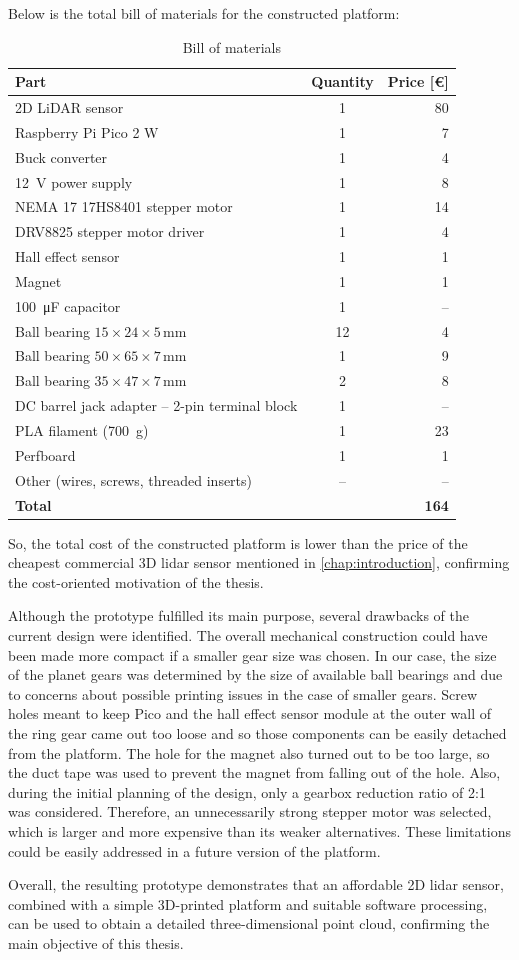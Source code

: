 Below is the total bill of materials for the constructed platform:
\begin{table}[H]
    \centering
    \caption{Bill of materials}
    \begin{tabular}{lcr}
        \toprule
        Part & Quantity & Price [\euro] \\
        \midrule
        2D LiDAR sensor & 1 & 80 \\
        Raspberry Pi Pico 2 W & 1 & 7 \\
        Buck converter & 1 & 4 \\
        \SI{12}{V} power supply & 1 & 8 \\
        NEMA 17 17HS8401 stepper motor & 1 & 14 \\
        DRV8825 stepper motor driver & 1 & 4 \\
        Hall effect sensor & 1 & 1 \\
        Magnet & 1 & 1 \\
        \SI{100}{\micro\farad} capacitor & 1 & -- \\
        Ball bearing $15 \times 24 \times 5\,\si{\milli\meter}$ & 12 & 4 \\
        Ball bearing $50 \times 65 \times 7\,\si{\milli\meter}$ & 1 & 9 \\
        Ball bearing $35 \times 47 \times 7\,\si{\milli\meter}$ & 2 & 8 \\
        DC barrel jack adapter -- 2-pin terminal block & 1 & -- \\
        PLA filament (\SI{700}{g}) & 1 & 23 \\
        Perfboard & 1 & 1 \\
        Other (wires, screws, threaded inserts) & -- & -- \\
        \midrule
        \textbf{Total} & & \textbf{164} \\
        \bottomrule
    \end{tabular}
\end{table}

So, the total cost of the constructed platform is lower than the price of the cheapest commercial 3D \gls{lidar} sensor mentioned in \cref{chap:introduction}, confirming the cost-oriented motivation of the thesis.

Although the prototype fulfilled its main purpose, several drawbacks of the current design were identified.
The overall mechanical construction could have been made more compact if a smaller gear size was chosen. In our case, the size of the planet gears was determined by the size of available ball bearings and due to concerns about possible printing issues in the case of smaller gears.
Screw holes meant to keep Pico and the hall effect sensor module at the outer wall of the ring gear came out too loose and so those components can be easily detached from the platform. The hole for the magnet also turned out to be too large, so the duct tape was used to prevent the magnet from falling out of the hole.
Also, during the initial planning of the design, only a gearbox reduction ratio of 2:1 was considered. Therefore, an unnecessarily strong stepper motor was selected, which is larger and more expensive than its weaker alternatives.
These limitations could be easily addressed in a future version of the platform.

Overall, the resulting prototype demonstrates that an affordable 2D \gls{lidar} sensor, combined with a simple 3D-printed platform and suitable software processing, can be used to obtain a detailed three-dimensional point cloud, confirming the main objective of this thesis.
